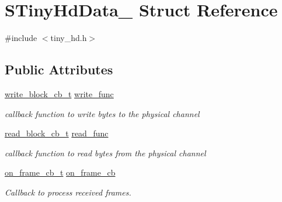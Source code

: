 \hypertarget{structSTinyHdData__}{}\section{S\+Tiny\+Hd\+Data\+\_\+ Struct Reference}
\label{structSTinyHdData__}


{\ttfamily \#include $<$tiny\+\_\+hd.\+h$>$}

\subsection*{Public Attributes}
\begin{DoxyCompactItemize}
\item 
\mbox{\label{structSTinyHdData___a38e79c64fc438348421c3dac60349cbe}} 
\hyperlink{tiny__types_8h_aafd634660bba76cace57a8f9b01e044d}{write\+\_\+block\+\_\+cb\+\_\+t} \hyperlink{structSTinyHdData___a38e79c64fc438348421c3dac60349cbe}{write\+\_\+func}
\begin{DoxyCompactList}\small\item\em callback function to write bytes to the physical channel \end{DoxyCompactList}\item 
\mbox{\label{structSTinyHdData___a788bb96f41bfd7bdb6ce62e5fd018632}} 
\hyperlink{tiny__types_8h_a15bec127d9ee63658563d62e92b5261b}{read\+\_\+block\+\_\+cb\+\_\+t} \hyperlink{structSTinyHdData___a788bb96f41bfd7bdb6ce62e5fd018632}{read\+\_\+func}
\begin{DoxyCompactList}\small\item\em callback function to read bytes from the physical channel \end{DoxyCompactList}\item 
\mbox{\label{structSTinyHdData___abf8a0eb5006769a92adc186554a3a1c0}} 
\hyperlink{tiny__types_8h_ad6bf709565b8aecb9e6ecf196f219d54}{on\+\_\+frame\+\_\+cb\+\_\+t} \hyperlink{structSTinyHdData___abf8a0eb5006769a92adc186554a3a1c0}{on\+\_\+frame\+\_\+cb}
\begin{DoxyCompactList}\small\item\em Callback to process received frames. \end{DoxyCompactList}\item 
\mbox{\label{structSTinyHdData___a159a56591682bfb0ff6c5020b26590f6}} 

\end{DoxyCompactItemize}
